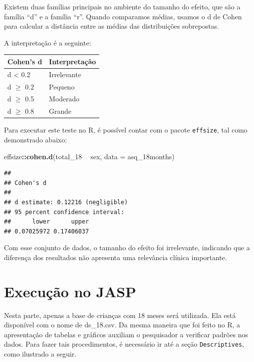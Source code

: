 \documentclass[
]{book}
\newenvironment{Shaded}{\begin{snugshade}}{\end{snugshade}}
\newcommand{\DataTypeTok}[1]{\textcolor[rgb]{0.13,0.29,0.53}{#1}}
\newcommand{\DecValTok}[1]{\textcolor[rgb]{0.00,0.00,0.81}{#1}}
\newcommand{\KeywordTok}[1]{\textcolor[rgb]{0.13,0.29,0.53}{\textbf{#1}}}
\newcommand{\NormalTok}[1]{#1}
\newcommand{\OperatorTok}[1]{\textcolor[rgb]{0.81,0.36,0.00}{\textbf{#1}}}
\newcommand{\StringTok}[1]{\textcolor[rgb]{0.31,0.60,0.02}{#1}}
\begin{document}
Existem duas famílias principais no ambiente do tamanho do efeito, que são a família ``d'' e a família ``r''. Quando comparamos médias, usamos o d de Cohen para calcular a distância entre as médias das distribuições sobrepostas.

A interpretação é a seguinte:

\begin{longtable}[]{@{}ll@{}}
\toprule
Cohen's d & Interpretação\tabularnewline
\midrule
\endhead
d \textless{} 0.2 & Irrelevante\tabularnewline
d \(\geq\) 0.2 & Pequeno\tabularnewline
d \(\geq\) 0.5 & Moderado\tabularnewline
d \(\geq\) 0.8 & Grande\tabularnewline
\bottomrule
\end{longtable}

Para executar este teste no R, é possível contar com o pacote \texttt{effsize}, tal como demonstrado abaixo:

\begin{Shaded}
\begin{Highlighting}[]
\NormalTok{effsize}\OperatorTok{::}\KeywordTok{cohen.d}\NormalTok{(total_}\DecValTok{18} \OperatorTok{~}\StringTok{ }\NormalTok{sex, }\DataTypeTok{data =}\NormalTok{ asq_18months)}
\end{Highlighting}
\end{Shaded}

\begin{verbatim}
## 
## Cohen's d
## 
## d estimate: 0.12216 (negligible)
## 95 percent confidence interval:
##      lower      upper 
## 0.07025972 0.17406037
\end{verbatim}

Com esse conjunto de dados, o tamanho do efeito foi irrelevante, indicando que a diferença dos resultados não apresenta uma relevância clínica importante.

\hypertarget{execuuxe7uxe3o-no-jasp-2}{%
\section{Execução no JASP}\label{execuuxe7uxe3o-no-jasp-2}}

Nesta parte, apenas a base de crianças com 18 meses será utilizada. Ela está disponível com o nome de ds\_18.csv. Da mesma maneira que foi feito no R, a apresentação de tabelas e gráficos auxiliam o pesquisador a verificar padrões nos dados. Para fazer tais procedimentos, é necessário ir até a seção \texttt{Descriptives}, como ilustrado a seguir.
\end{document}
